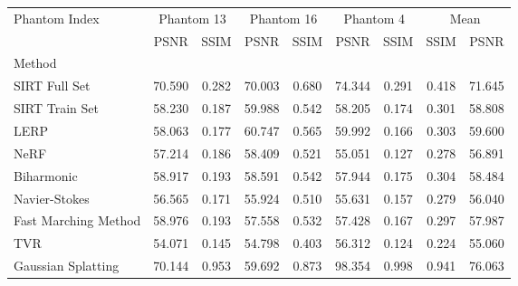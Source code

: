 \begin{tabular}{|l|cc|cc|cc|cc|}
\toprule
Phantom Index & \multicolumn{2}{c|}{Phantom 13} & \multicolumn{2}{c|}{Phantom 16} & \multicolumn{2}{c|}{Phantom 4} & \multicolumn{2}{c|}{Mean} \\
 & PSNR & SSIM & PSNR & SSIM & PSNR & SSIM & SSIM & PSNR \\
Method &  &  &  &  &  &  &  &  \\
\midrule
SIRT Full Set & 70.590 & 0.282 & 70.003 & 0.680 & 74.344 & 0.291 & 0.418 & 71.645 \\
SIRT Train Set & 58.230 & 0.187 & \cellcolor{ranksecond}59.988 & \cellcolor{rankthird}0.542 & \cellcolor{rankthird}58.205 & \cellcolor{rankthird}0.174 & 0.301 & \cellcolor{rankthird}58.808 \\
LERP & 58.063 & 0.177 & \cellcolor{rankfirst}60.747 & \cellcolor{ranksecond}0.565 & \cellcolor{ranksecond}59.992 & 0.166 & \cellcolor{rankthird}0.303 & \cellcolor{ranksecond}59.600 \\
NeRF & 57.214 & 0.186 & 58.409 & 0.521 & \cellcolor{rankworst}55.051 & 0.127 & 0.278 & 56.891 \\
Biharmonic & \cellcolor{rankthird}58.917 & \cellcolor{rankthird}0.193 & 58.591 & \cellcolor{rankthird}0.542 & 57.944 & \cellcolor{ranksecond}0.175 & \cellcolor{ranksecond}0.304 & 58.484 \\
Navier-Stokes & 56.565 & 0.171 & 55.924 & 0.510 & 55.631 & 0.157 & 0.279 & 56.040 \\
Fast Marching Method & \cellcolor{ranksecond}58.976 & \cellcolor{rankthird}0.193 & 57.558 & 0.532 & 57.428 & 0.167 & 0.297 & 57.987 \\
TVR & \cellcolor{rankworst}54.071 & \cellcolor{rankworst}0.145 & \cellcolor{rankworst}54.798 & \cellcolor{rankworst}0.403 & 56.312 & \cellcolor{rankworst}0.124 & \cellcolor{rankworst}0.224 & \cellcolor{rankworst}55.060 \\
Gaussian Splatting & \cellcolor{rankfirst}70.144 & \cellcolor{rankfirst}0.953 & \cellcolor{rankthird}59.692 & \cellcolor{rankfirst}0.873 & \cellcolor{rankfirst}98.354 & \cellcolor{rankfirst}0.998 & \cellcolor{rankfirst}0.941 & \cellcolor{rankfirst}76.063 \\
\bottomrule
\end{tabular}
